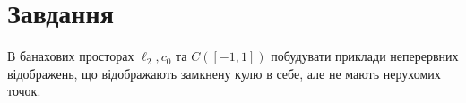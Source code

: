 
\chapter{Завдання \theHchapter}

\begin{tcolorbox}[title=Завдання]
    В банахових просторах $\ell_{2}, c_{0}$ та $C([-1,1])$ 
    побудувати приклади неперервних відображень, 
    що відображають замкнену кулю в себе, але не мають нерухомих точок.

\end{tcolorbox}



